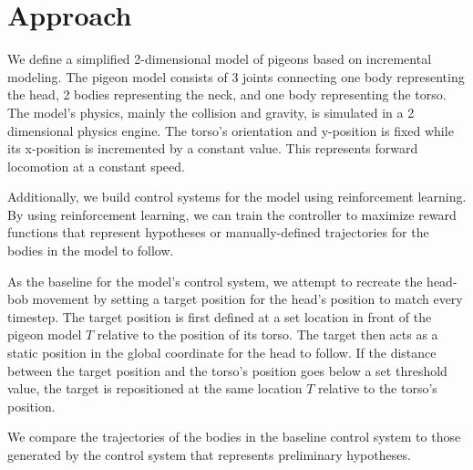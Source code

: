 \chapter{Approach}
  We define a simplified 2-dimensional model of pigeons based on incremental modeling. The pigeon model consists of 3 joints connecting one body representing the head, 2 bodies representing the neck, and one body representing the torso. The model's physics, mainly the collision and gravity, is simulated in a 2 dimensional physics engine. The torso's orientation and y-position is fixed while its x-position is incremented by a constant value. This represents forward locomotion at a constant speed.

  Additionally, we build control systems for the model using reinforcement learning. By using reinforcement learning, we can train the controller to maximize reward functions that represent hypotheses or manually-defined trajectories for the bodies in the model to follow.

  As the baseline for the model's control system, we attempt to recreate the head-bob movement by setting a target position for the head's position to match every timestep. The target position is first defined at a set location in front of the pigeon model $T$ relative to the position of its torso. The target then acts as a static position in the global coordinate for the head to follow. If the distance between the target position and the torso's position goes below a set threshold value, the target is repositioned at the same location $T$ relative to the torso's position.

  We compare the trajectories of the bodies in the baseline control system to those generated by the control system that represents preliminary hypotheses.


    



